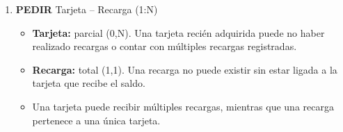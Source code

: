 \documentclass[12pt]{article}
\begin{document}
\begin{enumerate}
    \item \textbf{PEDIR} Tarjeta -- Recarga (1:N)
    \begin{itemize}
        \item \textbf{Tarjeta:} parcial (0,N). Una tarjeta recién adquirida puede no haber realizado recargas o contar con múltiples recargas registradas.
        \item \textbf{Recarga:} total (1,1). Una recarga no puede existir sin estar ligada a la tarjeta que recibe el saldo.
        \item Una tarjeta puede recibir múltiples recargas, mientras que una recarga pertenece a una única tarjeta.
    \end{itemize}
\end{enumerate}
\end{document}
